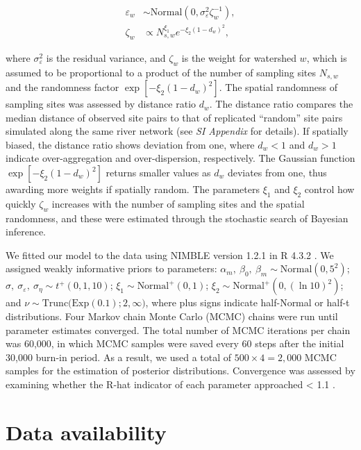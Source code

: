\documentclass[11pt, class=article, crop=false]{standalone}
\begin{document}
\begin{align}
    \varepsilon_w &\sim \mbox{Normal}(0, \sigma_{\varepsilon}^2 \zeta_w^{-1}),\\
    \zeta_w &\propto N_{s, w}^{\xi_1} e^{-\xi_2 (1 - d_{w})^2},
\end{align}

where $\sigma_{\varepsilon}^2$ is the residual variance, and $\zeta_w$ is the weight for watershed $w$, which is assumed to be proportional to a product of the number of sampling sites $N_{s,w}$ and the randomness factor $\exp[-\xi_2 (1 - d_{w})^2]$.
The spatial randomness of sampling sites was assessed by distance ratio $d_{w}$.
The distance ratio compares the median distance of observed site pairs to that of replicated ``random'' site pairs simulated along the same river network (see \textit{SI Appendix} for details).
If spatially biased, the distance ratio shows deviation from one, where $d_{w} < 1$ and $d_{w} > 1$ indicate over-aggregation and over-dispersion, respectively.
The Gaussian function $\exp[-\xi_2 (1 - d_{w})^2]$ returns smaller values as $d_{w}$ deviates from one, thus awarding more weights if spatially random.
The parameters $\xi_1$ and $\xi_2$ control how quickly $\zeta_w$ increases with the number of sampling sites and the spatial randomness, and these were estimated through the stochastic search of Bayesian inference.

We fitted our model to the data using NIMBLE version 1.2.1 \citep{nimble, pkg_nimble} in R 4.3.2 \citep{r_program}.
We assigned weakly informative priors to parameters: $\alpha_m,~\beta_0,~\beta_m \sim \mbox{Normal}(0, 5^2)$; $\sigma,~\sigma_{\varepsilon},~\sigma_{\eta} \sim t^+(0, 1, 10)$; $\xi_1 \sim \mbox{Normal}^+(0, 1)$; $\xi_2 \sim \mbox{Normal}^+(0, (\ln 10)^2)$; and $\nu \sim \mbox{Trunc(Exp}(0.1); 2, \infty)$, where plus signs indicate half-Normal or half-t distributions. 
Four Markov chain Monte Carlo (MCMC) chains were run until parameter estimates
converged.
The total number of MCMC iterations per chain was 60,000, in which MCMC samples were saved every 60 steps after the initial 30,000 burn-in period.
As a result, we used a total of $500 \times 4 = 2,000$ MCMC samples for the estimation of posterior distributions.
Convergence was assessed by examining whether the R-hat indicator of each parameter approached < 1.1 \citep{gelman2013bayesian}.

\section{Data availability}
\end{document}
